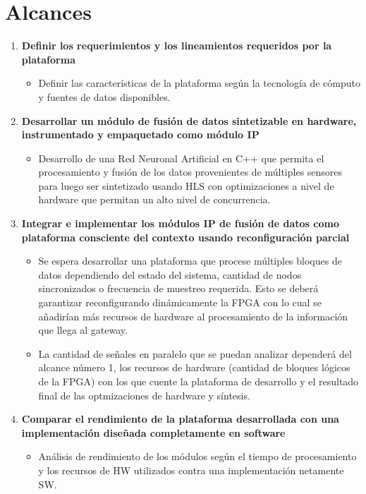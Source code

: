 
\chapter{Alcances} %
\label{Chapter5}

\begin{enumerate}
\item \textbf{Definir los requerimientos y los lineamientos requeridos por la plataforma}
\begin{itemize}
\item Definir las características de la plataforma según la tecnología de cómputo y fuentes de datos disponibles.
\end{itemize}
\item \textbf{Desarrollar un módulo de fusión de datos sintetizable en hardware, instrumentado y empaquetado como módulo IP}
\begin{itemize}
\item Desarrollo de una Red Neuronal Artificial en C++ que permita el procesamiento y fusión de los datos provenientes de múltiples sensores para luego ser sintetizado usando HLS con optimizaciones a nivel de hardware que permitan un alto nivel de concurrencia.
\end{itemize}
\item  \textbf{Integrar e implementar los módulos IP de fusión de datos como plataforma consciente del contexto usando reconfiguración parcial}
\begin{itemize}
\item Se espera desarrollar una plataforma que procese múltiples bloques de datos dependiendo del estado del sistema, cantidad de nodos sincronizados o frecuencia de muestreo requerida. Esto se deberá garantizar reconfigurando dinámicamente la FPGA con lo cual se añadirían más recursos de hardware al procesamiento de la información que llega al gateway.
\item La cantidad de señales en paralelo que se puedan analizar dependerá del alcance número 1, los recursos de hardware (cantidad de bloques lógicos de la FPGA) con los que cuente la plataforma de desarrollo y el resultado final de las optmizaciones de hardware y síntesis.
\end{itemize}
\item  \textbf{Comparar el rendimiento de la plataforma desarrollada con una implementación diseñada completamente en software}
\begin{itemize}
\item Análisis de rendimiento de los módulos según el tiempo de procesamiento y los recursos de HW utilizados contra una implementación netamente SW.
\end{itemize}

\end{enumerate}
